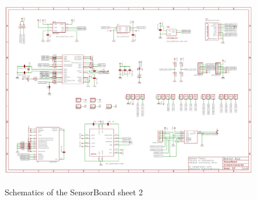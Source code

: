 \begin{figure}
	\centering
	\includegraphics[angle=90, width=\linewidth]{img/sch2.pdf}
	\label{sch2}
	\caption{Schematics of the SensorBoard sheet 2}
\end{figure}

